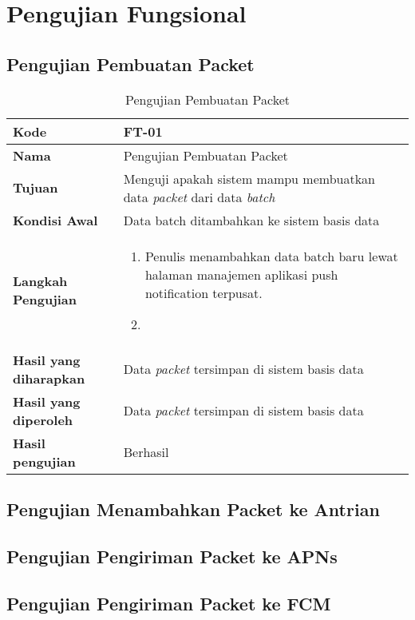 \section{Pengujian Fungsional}

\subsection{Pengujian Pembuatan Packet}

\begin{longtable}{|p{2.5cm}|p{6.5cm}|}
	\caption{Pengujian Pembuatan Packet} \label{t:uji_pembuatan_packet} \\ \hline
	\textbf{Kode} & FT-01 \\ \hline
	\textbf{Nama} & Pengujian Pembuatan Packet \\ \hline
	\textbf{Tujuan} & Menguji apakah sistem mampu membuatkan data \textit{packet} dari data \textit{batch} \\ \hline
	\textbf{Kondisi Awal} & Data batch ditambahkan ke sistem basis data \\ \hline
	\textbf{Langkah Pengujian} &  
	\begin{enumerate}
		\item Penulis menambahkan data batch baru lewat halaman manajemen aplikasi push notification terpusat.
		\item 
	\end{enumerate} \\ \hline
	\textbf{Hasil yang diharapkan} & Data \textit{packet} tersimpan di sistem basis data \\ \hline
	\textbf{Hasil yang diperoleh} & Data \textit{packet} tersimpan di sistem basis data \\ \hline
	\textbf{Hasil pengujian} & Berhasil \\ \hline
\end{longtable}

\subsection{Pengujian Menambahkan Packet ke Antrian}

\subsection{Pengujian Pengiriman Packet ke APNs}

\subsection{Pengujian Pengiriman Packet ke FCM}

